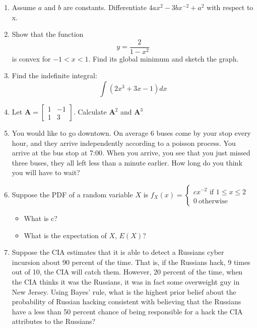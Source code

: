 \documentclass[12pt]{article}
\begin{document}
\begin{enumerate}

\item Assume $a$ and $b$ are constants.  Differentiate $4ax^2-3bx^{-2}+a^2$ with respect to x.  
\vspace{2 cm}
\item Show that the function 
$$y=\frac{2}{1-x^2}$$
is convex for $-1<x<1$.  Find its global minimum and sketch the graph.
\vfill
\item Find the indefinite integral:
$$\int (2x^3+3x -1) dx$$
\vspace{2 cm}
\item Let $\mathbf{A}=\begin{bmatrix} 1 & -1 \\ 1 & 3 \end{bmatrix}$. Calculate $\mathbf{A}^2$ and $\mathbf{A}^3$

\newpage
\item You would like to go downtown. On average 6 buses come by your stop every hour, and they arrive independently according to a poisson process. You arrive at the bus stop at 7:00.  When you arrive, you see that you just missed three buses, they all left less than a minute earlier.  How long do you think you will have to wait?  
\vspace{1 cm}
\item Suppose the PDF of a random variable $X$ is $f_X(x)=\begin{cases} cx^{-2}\text{ if }1\leq x\leq2\\ 0\ \text{otherwise} \end{cases}$

\begin{itemize}
\item What is c? 
\vspace{1cm}
\item What is the expectation of $X$, $E(X)$?
\end{itemize}
\vfill

\item Suppose the CIA estimates that it is able to detect a Russians cyber incursion about 90 percent of the time.  That is, if the Russians hack, 9 times out of 10, the CIA will catch them.  However, 20 percent of the time, when the CIA thinks it was the Russians, it was in fact some overweight guy in New Jersey.  Using Bayes' rule, what is the highest prior belief about the probability of Russian hacking consistent with believing that the Russians have a less than 50 percent chance of being responsible for a hack the CIA attributes to the Russians?
\vspace{1 cm}
  


\end{enumerate}
\end{document}
